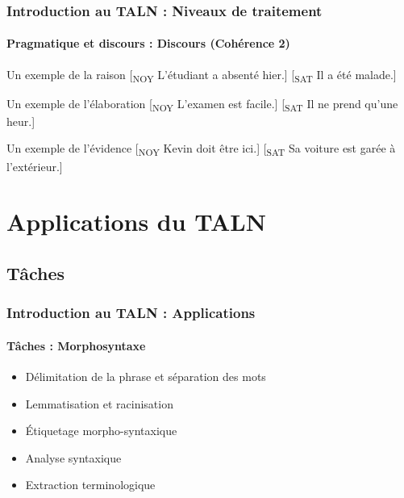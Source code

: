 \documentclass[xcolor=table]{beamer}
\begin{document}
\begin{frame}
\frametitle{Introduction au TALN : Niveaux de traitement}
\framesubtitle{Pragmatique et discours : Discours (Cohérence 2)}

\begin{exampleblock}{Un exemple de la raison}
	[\textsubscript{NOY} L'étudiant a absenté hier.] [\textsubscript{SAT} Il a été malade.]
\end{exampleblock}

\begin{exampleblock}{Un exemple de l'élaboration}
	[\textsubscript{NOY} L'examen est facile.] [\textsubscript{SAT} Il ne prend qu'une heur.]
\end{exampleblock}

\begin{exampleblock}{Un exemple de l'évidence}
	[\textsubscript{NOY} Kevin doit être ici.] [\textsubscript{SAT} Sa voiture est garée à l'extérieur.]
\end{exampleblock}


\end{frame}

\section{Applications du TALN}

%

\subsection{Tâches}

\begin{frame}
\frametitle{Introduction au TALN : Applications}
\framesubtitle{Tâches : Morphosyntaxe}

\begin{itemize}
	\item Délimitation de la phrase et séparation des mots 
	\item Lemmatisation et racinisation
	\item Étiquetage morpho-syntaxique
	\item Analyse syntaxique
	\item Extraction terminologique
\end{itemize}

\end{frame}
\end{document}
